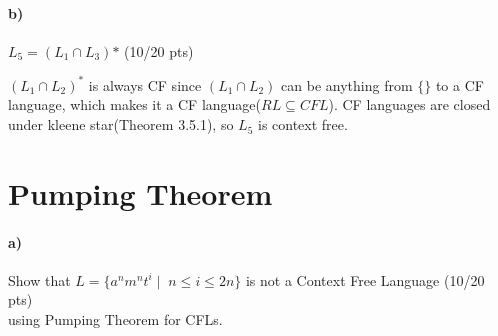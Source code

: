\documentclass[a4paper,12pt]{article}
\begin{document}
\paragraph{b)} $L_5 = (L_1 \cap L_3)\text{*}$ \hfill \small{(10/20 pts)} \\

\begin{tcolorbox}
$(L_1 \cap L_2)^*$ is always CF since $(L_1 \cap L_2)$ can be anything from $\{ \}$ to a CF language, which makes it a CF language($RL \subseteq CFL $). CF languages are closed under kleene star(Theorem 3.5.1), so $L_5$ is context free.
\end{tcolorbox}





\newpage
\section{Pumping Theorem \hfill {}}

\paragraph{a)} Show that $L=\{a^n m^n t^i \mid \; n\leq i \leq 2n\}$ is not a Context Free Language \hfill \small{(10/20 pts)} \\
using Pumping Theorem for CFLs. \\
\end{document}
